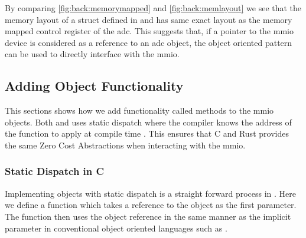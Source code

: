 By comparing \autoref{fig:back:memorymapped} and \autoref{fig:back:memlayout} we see that the memory layout of a struct defined in \rust and \C has same exact layout as the memory mapped control register of the \gls{adc}.
This suggests that, if a pointer to the \gls{mmio} device is considered as a reference to an \gls{adc} object, the object oriented pattern can be used to directly interface with the \gls{mmio}.

\subsection{Adding Object Functionality}

This sections shows how we add functionality called methods to the \gls{mmio} objects.
Both \C and \rust uses static dispatch where the compiler knows the address of the function to apply at compile time .
This ensures that C and Rust provides the same Zero Cost Abstractions when interacting with the \gls{mmio}.

\subsubsection{Static Dispatch in C}

Implementing objects with static dispatch is a straight forward process in \C.
Here we define a function which takes a reference to the object as the first parameter.
The function then uses the object reference in the same manner as the implicit  parameter in conventional object oriented languages such as \Java.


